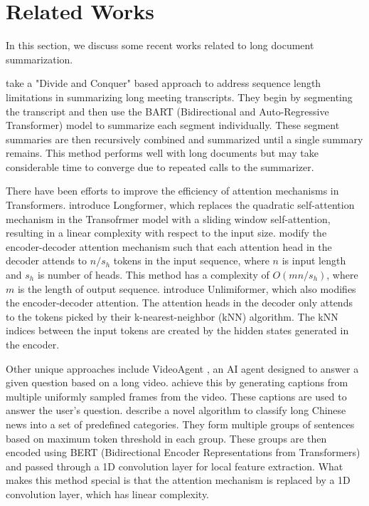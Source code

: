 \section{Related Works}

In this section, we discuss some recent works related to long document summarization.

\citet{10.1145/3639233.3639253} take a "Divide and Conquer" based approach to address
sequence length limitations in summarizing long meeting transcripts.
They begin by segmenting the transcript and then use the BART (Bidirectional and
Auto-Regressive Transformer) model to summarize each segment individually.
These segment summaries are then recursively combined and summarized until a single
summary remains.
This method performs well with long documents but may take considerable time to converge due
to repeated calls to the summarizer.

There have been efforts to improve the efficiency of attention mechanisms in Transformers.
\citet{beltagy2020longformer} introduce Longformer, which replaces the quadratic
self-attention mechanism in the Transofrmer model with a sliding window self-attention,
resulting in a linear complexity with respect to the input size.
\citet{huang-etal-2021-efficient} modify the encoder-decoder attention mechanism such that
each attention head in the decoder attends to $n/s_h$ tokens in the input sequence, where
$n$ is input length and $s_h$ is number of heads.
This method has a complexity of $O(mn/s_h)$, where $m$ is the length of output sequence.
\citet{NEURIPS2023_6f9806a5} introduce Unlimiformer, which also modifies the encoder-decoder
attention.
The attention heads in the decoder only attends to the tokens picked by their
k-nearest-neighbor (kNN) algorithm.
The kNN indices between the input tokens are created by the hidden states generated in the
encoder.

Other unique approaches include VideoAgent \cite{wang2024videoagent}, an AI agent designed
to answer a given question based on a long video. \citet{wang2024videoagent} achieve this
by generating captions from multiple uniformly sampled frames from the video.
These captions are used to answer the user's question.
\citet{chen2022long} describe a novel algorithm to classify long Chinese news into a set
of predefined categories.
They form multiple groups of sentences based on maximum token threshold in each group.
These groups are then encoded using BERT (Bidirectional Encoder Representations from
Transformers) and passed through a 1D convolution layer for local feature extraction.
What makes this method special is that the attention mechanism is replaced by a 1D
convolution layer, which has linear complexity.
